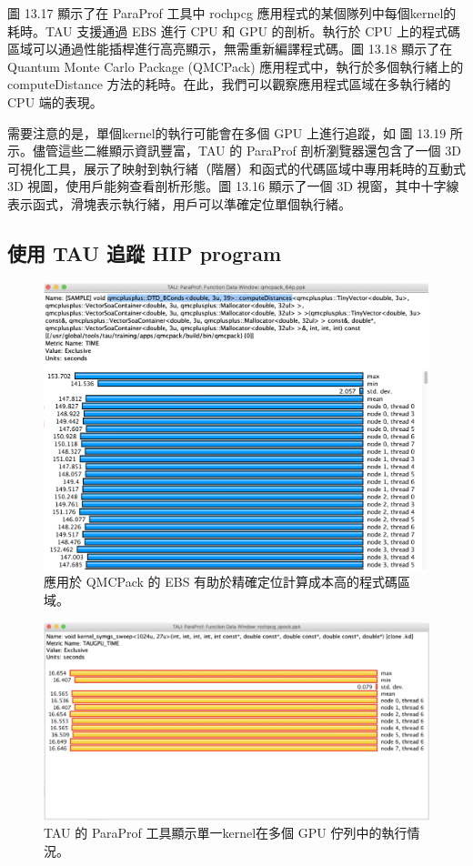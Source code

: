 圖 13.17 顯示了在 ParaProf 工具中 rochpcg 應用程式的某個隊列中每個kernel的耗時。TAU 支援通過 EBS 進行 CPU 和 GPU 的剖析。執行於 CPU 上的程式碼區域可以通過性能插桿進行高亮顯示，無需重新編譯程式碼。圖 13.18 顯示了在 Quantum Monte Carlo Package (QMCPack) 應用程式中，執行於多個執行緒上的 computeDistance 方法的耗時。在此，我們可以觀察應用程式區域在多執行緒的 CPU 端的表現。

需要注意的是，單個kernel的執行可能會在多個 GPU 上進行追蹤，如 圖 13.19 所示。儘管這些二維顯示資訊豐富，TAU 的 ParaProf 剖析瀏覽器還包含了一個 3D 可視化工具，展示了映射到執行緒（階層）和函式的代碼區域中專用耗時的互動式 3D 視圖，使用戶能夠查看剖析形態。圖 13.16 顯示了一個 3D 視窗，其中十字線表示函式，滑塊表示執行緒，用戶可以準確定位單個執行緒。


\subsection{使用 TAU 追蹤 HIP program}


\begin{figure}
    \centering
    \includegraphics[width=0.9\linewidth]{FileAusiliari/Screenshots/Figure13-18.png}
    \caption{應用於 QMCPack 的 EBS 有助於精確定位計算成本高的程式碼區域。}
    \label{fig:PAPI18}
\end{figure}

\begin{figure}
    \centering
    \includegraphics[width=0.9\linewidth]{FileAusiliari/Screenshots/Figure13-19.png}
    \caption{TAU 的 ParaProf 工具顯示單一kernel在多個 GPU 佇列中的執行情況。}
    \label{fig:PAPI19}
\end{figure}

